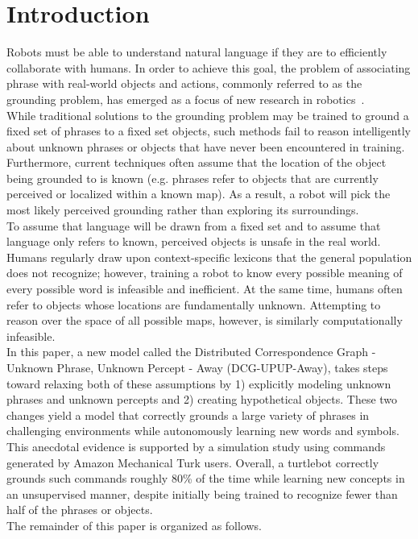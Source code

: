 \section{Introduction}
Robots must be able to understand natural language if they are to efficiently collaborate with humans.
In order to achieve this goal, the problem of associating phrase with real-world objects and actions, commonly referred to as the grounding problem, has emerged as a focus of new research in robotics~\cite{g3,dcg}.\\
\indent While traditional solutions to the grounding problem may be trained to ground a fixed set of phrases to a fixed set objects, such methods fail to reason intelligently about unknown phrases or objects that have never been encountered in training.
Furthermore, current techniques often assume that the location of the object being grounded to is known (e.g. phrases refer to objects that are currently perceived or localized within a known map).
As a result, a robot will pick the most likely perceived grounding rather than exploring its surroundings.\\
\indent To assume that language will be drawn from a fixed set and to assume that language only refers to known, perceived objects is unsafe in the real world.
Humans regularly draw upon context-specific lexicons that the general population does not recognize; however, training a robot to know every possible meaning of every possible word is infeasible and inefficient.
At the same time, humans often refer to objects whose locations are fundamentally unknown.
Attempting to reason over the space of all possible maps, however, is similarly computationally infeasible.\\
\indent In this paper, a new model called the Distributed Correspondence Graph - Unknown Phrase, Unknown Percept - Away (DCG-UPUP-Away), takes steps toward relaxing both of these assumptions by 1) explicitly modeling unknown phrases and unknown percepts and 2) creating hypothetical objects.
These two changes yield a model that correctly grounds a large variety of phrases in challenging environments while autonomously learning new words and symbols.
This anecdotal evidence is supported by a simulation study using commands generated by Amazon Mechanical Turk users.
Overall, a turtlebot correctly grounds such commands roughly 80\% of the time while learning new concepts in an unsupervised manner, despite initially being trained to recognize fewer than half of the phrases or objects.\\
\indent The remainder of this paper is organized as follows.
